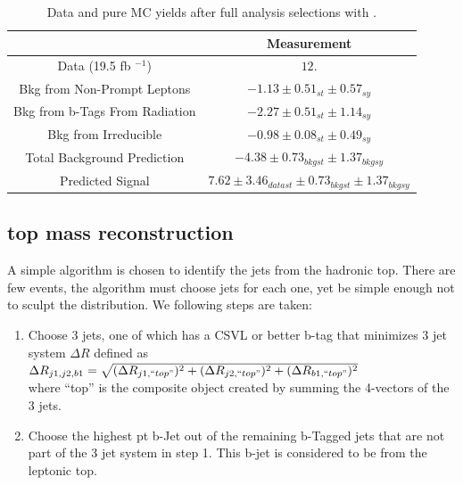 \begin{table}[ht!]
\begin{center}
\caption{\small \label{tab:signal_minus_bkg} Data and pure MC yields after full analysis selections with \intLumi.}
\begin{tabular}{c|c}\hline
 & Measurement\\
\hline \hline
Data (19.5 fb $^{-1}$)                         & $12. $ \\
Bkg from Non-Prompt Leptons                   &  $- 1.13 \pm 0.51_{st} \pm 0.57_{sy}$ \\
Bkg from b-Tags From Radiation                &  $- 2.27 \pm 0.51_{st} \pm 1.14_{sy}$ \\
Bkg from Irreducible                          &  $- 0.98 \pm 0.08_{st} \pm 0.49_{sy}$ \\
Total Background Prediction                   &  $-4.38 \pm 0.73_{bkg st} \pm 1.37_{bkg sy}$ \\
\hline
Predicted Signal                              &  $7.62 \pm 3.46_{data st} \pm 0.73_{bkg st} \pm 1.37_{bkg sy}$ \\	
\hline
\end{tabular}
\end{center}
\end{table}



	
	\subsection{top mass reconstruction}
	A simple algorithm is chosen to identify the jets from the hadronic top. There are few events, the algorithm must choose jets for each one, yet be simple enough not to sculpt the distribution. We following steps are taken:
\begin{enumerate}
\item Choose 3 jets, one of which has a CSVL or better b-tag that minimizes 3 jet system $\Delta R$ defined as \\
$\Delta R_{j1,j2,b1} = \sqrt{ (\Delta R_{j1, ``top"}) ^2 + (\Delta R_{j2, ``top"}) ^2 + (\Delta R_{b1, ``top"}) ^2 }$\\
where ``top'' is the composite object created by summing the 4-vectors of the 3 jets.
\item Choose the highest pt b-Jet out of the remaining b-Tagged jets that are not part of the 3 jet system in step 1. This b-jet is considered to be from the leptonic top.
\end{enumerate}


